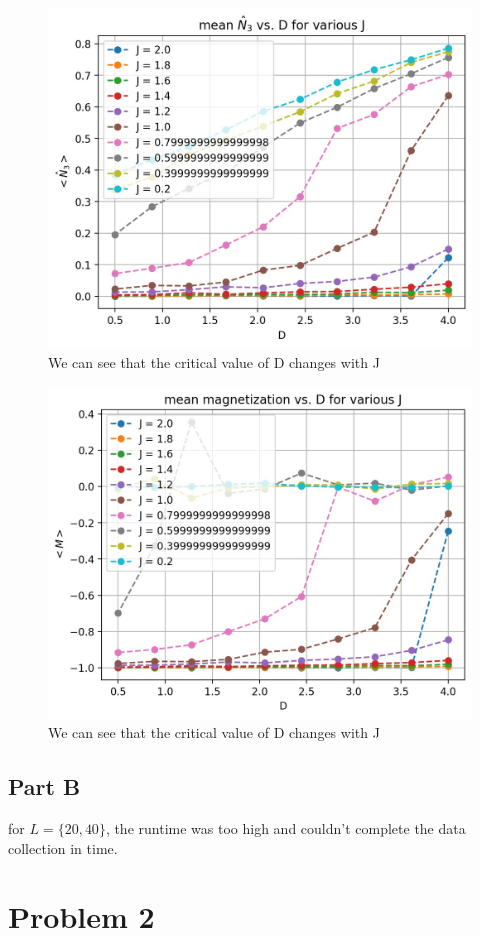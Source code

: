 \documentclass[12pt, a4paper]{article}
\begin{document}
	\begin{figure}[h!]
	\centering
	\includegraphics[width=.8\linewidth]{../p1/results/mean_n3_10.jpg}
	\caption{We can see that the critical value of D changes with J}
	\label{fig:n3_10}
\end{figure}

	\begin{figure}[h!]
	\centering
	\includegraphics[width=.8\linewidth]{../p1/results/magnetization_10.jpg}
	\caption{We can see that the critical value of D changes with J}
	\label{fig:mag_10}
\end{figure}
	
	\subsection{Part B}
	for $L = \{20, 40\}$, the runtime was too high and couldn't complete the data collection in time.
	\section{Problem 2}
\end{document}
